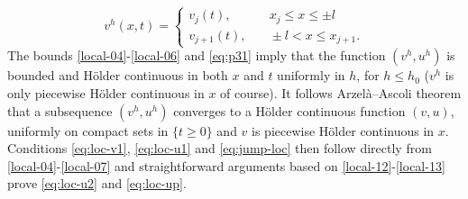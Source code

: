\documentclass[a4paper,oneside,11pt]{article}
\numberwithin{equation}{section}
\begin{document}
\[v^h(x,t)=\begin{cases}v_j(t),&\quad x_j\leq x\leq \pm l\\v_{j+1}(t),&\quad \pm l<x\leq x_{j+1}.\end{cases}\]
The bounds \eqref{local-04}-\eqref{local-06} and \eqref{eq:p31} imply that the function \((v^h,u^h)\) is bounded and H\"{o}lder continuous in both \(x\) and \(t\) uniformly in \(h\), for \(h\leq h_{0}\) (\(v^{h}\) is only piecewise H\"{o}lder continuous in $x$ of course). 
It follows Arzelà–Ascoli theorem that a subsequence \((v^h,u^h)\) converges to a H\"{o}lder continuous function \((v,u)\), uniformly on compact sets in \(\{t\geq 0\}\) and \(v\) is piecewise H\"{o}lder continuous in \(x\). 
Conditions \eqref{eq:loc-v1}, \eqref{eq:loc-u1} and \eqref{eq:jump-loc} then follow directly from \eqref{local-04}-\eqref{local-07} and straightforward arguments based on \eqref{local-12}-\eqref{local-13} prove \eqref{eq:loc-u2} and \eqref{eq:loc-up}.
\end{document}
